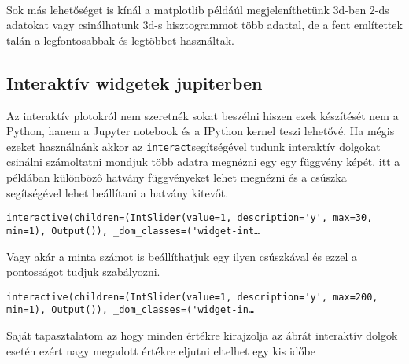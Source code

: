     \begin{center}
    \end{center}
    { \hspace*{\fill} \\}
    
    Sok más lehetőséget is kínál a matplotlib példáúl megjeleníthetünk
3d-ben 2-ds adatokat vagy csinálhatunk 3d-s hisztogrammot több adattal,
de a fent említettek talán a legfontosabbak és legtöbbet használtak.

    \subsection{Interaktív widgetek
jupiterben}\label{interaktuxedv-widgetek-jupiterben}

    Az interaktív plotokról nem szeretnék sokat beszélni hiszen ezek
készítését nem a Python, hanem a Jupyter notebook és a IPython kernel
teszi lehetővé. Ha mégis ezeket használnánk akkor az
\texttt{interact}segítségével tudunk interaktív dolgokat csinálni
számoltatni mondjuk több adatra megnézni egy egy függvény képét. itt a
példában különböző hatvány függvényeket lehet megnézni és a csúszka
segítségével lehet beállítani a hatvány kitevőt.

\begin{python}

\end{python}

    
    \begin{verbatim}
interactive(children=(IntSlider(value=1, description='y', max=30, min=1), Output()), _dom_classes=('widget-int…
    \end{verbatim}

    
    Vagy akár a minta számot is beállíthatjuk egy ilyen csúszkával és ezzel
a pontosságot tudjuk szabályozni.

\begin{python}

\end{python}

    
    \begin{verbatim}
interactive(children=(IntSlider(value=1, description='y', max=200, min=1), Output()), _dom_classes=('widget-in…
    \end{verbatim}

    
    Saját tapasztalatom az hogy minden értékre kirajzolja az ábrát
interaktív dolgok esetén ezért nagy megadott értékre eljutni eltelhet
egy kis időbe

